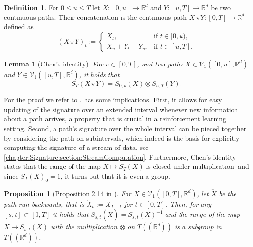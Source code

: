 \documentclass[
    a4paper,
    11pt,
    bibliography=totoc,
    listof=totoc,      
    headinclude=true,
    cleardoublepage=empty,
]{scrbook}
\theoremstyle{plain}
\newtheorem{lemma}[theorem]{Lemma}
\newtheorem{proposition}[theorem]{Proposition}
\theoremstyle{definition}
\newtheorem{definition}[theorem]{Definition}
\theoremstyle{remark}
\newcommand{\SetR}{\mathbb R}
\begin{document}
\begin{definition}
    For $0\leq u \leq T$ let $X:[0,u]\to\SetR^d$ and $Y:[u,T]\to\SetR^d$ be
    two continuous paths. Their concatenation is the continuous path
    $X\star Y:[0,T]\to\SetR^d$ defined as 
    \begin{equation}
        (X\star Y)_t :=
        \begin{cases}
            X_t, & \text{if } t\in [0,u), \\
            X_u + Y_t - Y_u, & \text{if } t\in [u,T].
        \end{cases}
    \end{equation}
\end{definition}

\begin{lemma}[Chen's identity]
\label{lem:ChensIdendity}
    For $u\in [0,T]$, and two paths $X \in \mathcal{V}_1([0,u],\SetR^d)$ and 
    $Y \in \mathcal{V}_1([u,T],\SetR^d)$, it holds that
    \begin{equation}
    \label{eq:ChensIdendity}
        S_T(X\star Y) = S_{0,u}(X) \otimes S_{u,T}(Y).
    \end{equation}
\end{lemma}
For the proof we refer to \cite{lyons2007_dedrp}. 
 has some implications. First, it allows for easy 
updating of the signature over an extended interval whenever new information 
about a path arrives, a property that is crucial in a reinforcement learning 
setting. Second, a path's signature over the whole interval can be pieced 
together by considering the path on subintervals, which indeed is the basis 
for explicitly computing the signature of a stream of data, see 
\cref{chapter:Signature:section:StreamComputation}. Furthermore, Chen's 
identity states that the range of the map $X\mapsto S_T(X)$ is closed under 
multiplication, and since $S_T(X)_0 = 1$, it turns out that it is even a group.

\begin{proposition}[Proposition 2.14 in \cite{lyons2007_dedrp}]
\label{prop:InverseSignature}
    For $X\in\mathcal{V}_1([0,T],\SetR^d)$, let $\overleftarrow{X}$ be the
    path run backwards, that is $\overleftarrow{X}_t:=X_{T-t}$ for
    $t\in[0,T]$. Then, for any $[s,t]\subset [0,T]$ it holds that $S_{s,t}
    (\overleftarrow{X}) = S_{s,t}(X)^{-1}$ and the range of the map $X\mapsto 
    S_{s,t}(X)$ with the multiplication $\otimes$ on $T((\SetR^d))$ is a 
    subgroup in $T((\SetR^d))$.
\end{proposition}
\end{document}
